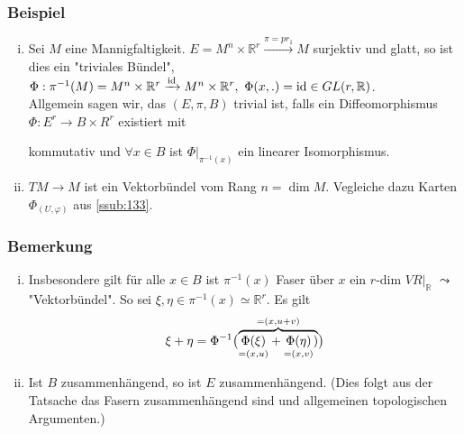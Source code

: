 \subsubsection[Beispiel: triviales Vektorbündel und Tangentialbündel]{Beispiel}
\label{ssub:137}
\begin{enumerate}[(i)]
\item Sei $M$ eine Mannigfaltigkeit. $E = M^n\times \mathds{R}^r \xrightarrow{\pi = pr_1} M$ surjektiv und glatt, so ist dies ein "triviales Bündel", $\Phi: \pi^{-1}(M) = M^n\times \mathds{R}^r \xrightarrow{\id} M^n\times \mathds{R}^r,\ \Phi(x,.) = \id \in GL(r,\mathds{R})$.\\
Allgemein sagen wir, das $(E,\pi,B)$ trivial ist, falls ein Diffeomorphismus $\Phi: E^r \to B\times R^r$ existiert mit
\begin{figure}[H]
\end{figure}
kommutativ und $\forall x\in B$ ist $\Phi\vert_{\pi^{-1}(x)}$ ein linearer Isomorphismus.
\item $TM \to M$ ist ein Vektorbündel vom Rang $n = \dim M$. Vegleiche dazu Karten $\Phi_{(U,\varphi)}$ aus \ref{ssub:133}.
\end{enumerate}

\subsubsection[Bemerkung: Vektorraumstruktur der Fasern]{Bemerkung}
\label{ssub:138}
\begin{enumerate}[(i)]
\item Insbesondere gilt für alle $x\in B$ ist $\pi^{-1}(x)$ Faser über $x$ ein $r$-dim $VR\vert_{\mathds{R}}$ $\leadsto$ "Vektorbündel". So sei $\xi,\eta \in \pi^{-1}(x) \simeq \mathds{R}^r$. Es gilt
\[
\xi+\eta = \Phi^{-1}\enbrace[\big]{\overbrace{\underset{=(x,u)}{\Phi(\xi)} + \underset{=(x,v)}{\Phi(\eta)})}^{= (x,u+v)}}
\]
\item Ist $B$ zusammenhängend, so ist $E$ zusammenhängend. (Dies folgt aus der Tatsache das Fasern zusammenhängend sind und allgemeinen topologischen Argumenten.)
\end{enumerate}

